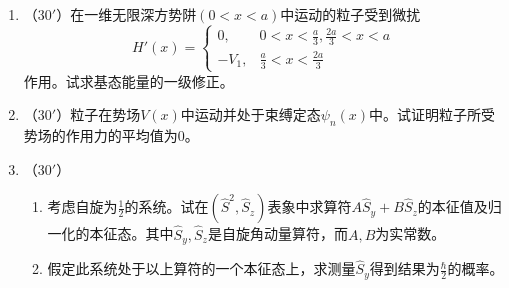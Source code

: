 
\begin{enumerate}
	\item
（$30'$）在一维无限深方势阱$(0<x<a)$中运动的粒子受到微扰
$$H'(x)=\begin{cases}0,&0<x<\frac{a}{3},\frac{2a}{3}<x<a\\
-V_1,&\frac{a}{3}<x<\frac{2a}{3}\end{cases}$$
作用。试求基态能量的一级修正。




\item 
（$30'$）粒子在势场$V(x)$中运动并处于束缚定态$\psi_n(x)$中。试证明粒子所受势场的作用力的平均值为$ 0  $。




\item 
（$30'$）
\begin{enumerate}
	\item
考虑自旋为$\frac{1}{2}$的系统。试在$(\hat{S}^2,\hat{S}_z)$表象中求算符$A\hat{S}_y+B\hat{S}_z$的本征值及归一化的本征态。其中$\hat{S}_y,\hat{S}_z$是自旋角动量算符，而$A,B$为实常数。

\item 
假定此系统处于以上算符的一个本征态上，求测量$\hat{S}_y$得到结果为$\frac{\hbar}{2}$的概率。
\end{enumerate}



\end{enumerate}
